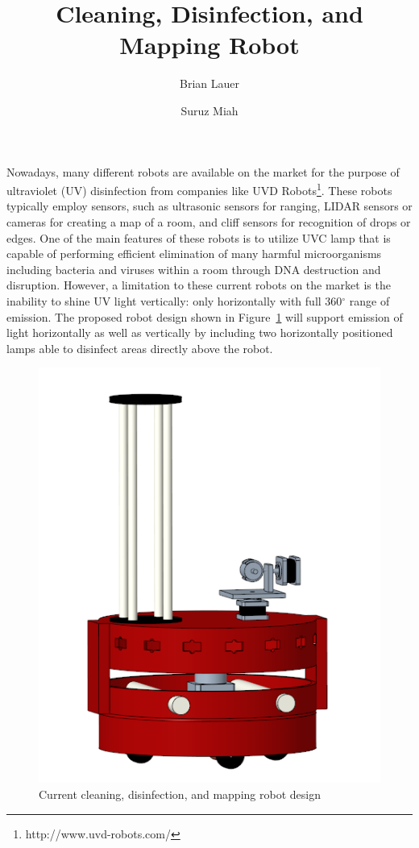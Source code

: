 \documentclass[10pt,a4paper]{article}
\title{Cleaning, Disinfection, and Mapping Robot}
\author{Brian Lauer\and Suruz Miah}
\begin{document}
\maketitle

Nowadays, many different robots are available on the market for the purpose of
ultraviolet (UV) disinfection from companies like UVD
Robots\footnote{http://www.uvd-robots.com/}. These robots typically employ
sensors, such as ultrasonic sensors for ranging, LIDAR sensors or cameras for
creating a map of a room, and cliff sensors for recognition of
drops or edges. One of the main features of these robots is to utilize UVC lamp that is
capable of performing efficient elimination of many harmful microorganisms
including bacteria and viruses within a room through DNA destruction and
disruption. However, a limitation to these current robots on the market is the
inability to shine UV light vertically: only horizontally with full 360$^\circ$
range of emission. The proposed robot design shown in Figure~\ref{camRobot} will
support emission of light horizontally as well as vertically by including two
horizontally positioned lamps able to disinfect areas directly above the
robot. %
%
\begin{figure}[htbp]
  \centering
  \includegraphics[scale=0.5]{figs/img/frontViewScreenshotB}
  \caption{Current cleaning, disinfection, and mapping robot design}
  \label{camRobot}
\end{figure}
\end{document}
